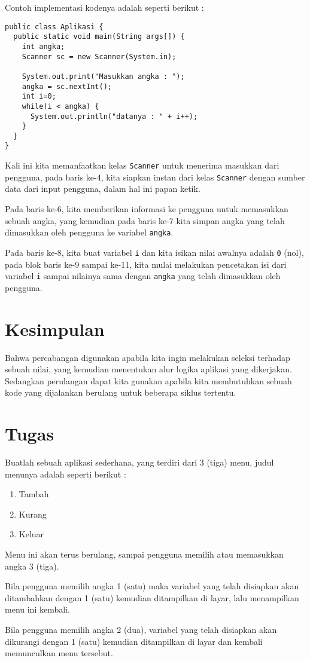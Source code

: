 Contoh implementasi kodenya adalah seperti berikut :

\begin{lstlisting}
public class Aplikasi {
  public static void main(String args[]) {
    int angka;
    Scanner sc = new Scanner(System.in);

    System.out.print("Masukkan angka : ");
    angka = sc.nextInt();
    int i=0;
    while(i < angka) {
      System.out.println("datanya : " + i++);
    }
  }
}
\end{lstlisting}

Kali ini kita memanfaatkan kelas \texttt{Scanner} untuk menerima masukkan dari pengguna, pada baris ke-4, kita siapkan instan dari kelas \texttt{Scanner} dengan sumber data dari input pengguna, dalam hal ini papan ketik.

Pada baris ke-6, kita memberikan informasi ke pengguna untuk memasukkan sebuah angka, yang kemudian pada baris ke-7 kita simpan angka yang telah dimasukkan oleh pengguna ke variabel \texttt{angka}.

Pada baris ke-8, kita buat variabel \texttt{i} dan kita isikan nilai awalnya adalah \texttt{0} (nol), pada blok baris ke-9 sampai ke-11, kita mulai melakukan pencetakan isi dari variabel \texttt{i} sampai nilainya sama dengan \texttt{angka} yang telah dimasukkan oleh pengguna.

\section{Kesimpulan}

Bahwa percabangan digunakan apabila kita ingin melakukan seleksi terhadap sebuah nilai, yang kemudian menentukan alur logika aplikasi yang dikerjakan. Sedangkan perulangan dapat kita gunakan apabila kita membutuhkan sebuah kode yang dijalankan berulang untuk beberapa siklus tertentu.

\section{Tugas}

Buatlah sebuah aplikasi sederhana, yang terdiri dari 3 (tiga) menu, judul menunya adalah seperti berikut :

\begin{enumerate}
  \item Tambah
  \item Kurang
  \item Keluar
\end{enumerate}

Menu ini akan terus berulang, sampai pengguna memilih atau memasukkan angka 3 (tiga). 

Bila pengguna memilih angka 1 (satu) maka variabel yang telah disiapkan akan ditambahkan dengan 1 (satu) kemudian ditampilkan di layar, lalu menampilkan menu ini kembali.

Bila pengguna memilih angka 2 (dua), variabel yang telah disiapkan akan dikurangi dengan 1 (satu) kemudian ditampilkan di layar dan kembali memunculkan menu tersebut.